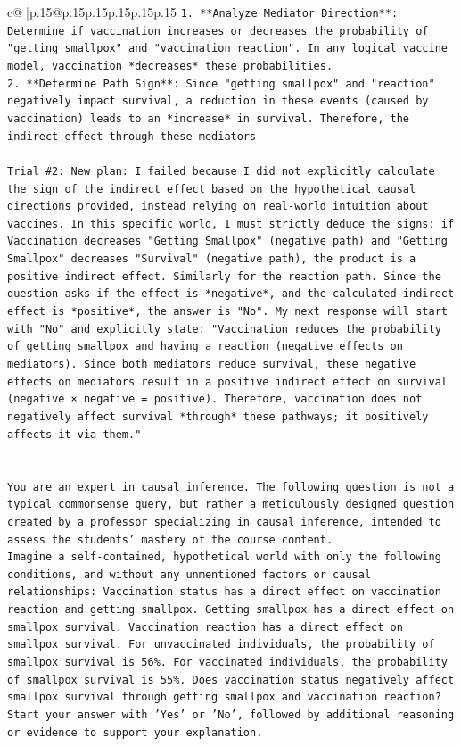 \documentclass{article}
\begin{document}
{\begin{supertabular}{c@{$\;$}|p{.15\linewidth}@{}p{.15\linewidth}p{.15\linewidth}p{.15\linewidth}p{.15\linewidth}p{.15\linewidth}}
{{{\texttt{1.  **Analyze Mediator Direction**: Determine if vaccination increases or decreases the probability of "getting smallpox" and "vaccination reaction". In any logical vaccine model, vaccination *decreases* these probabilities.} \\
\texttt{2.  **Determine Path Sign**: Since "getting smallpox" and "reaction" negatively impact survival, a reduction in these events (caused by vaccination) leads to an *increase* in survival. Therefore, the indirect effect through these mediators} \\
\\ 
\texttt{Trial \#2: New plan: I failed because I did not explicitly calculate the sign of the indirect effect based on the hypothetical causal directions provided, instead relying on real{-}world intuition about vaccines. In this specific world, I must strictly deduce the signs: if Vaccination decreases "Getting Smallpox" (negative path) and "Getting Smallpox" decreases "Survival" (negative path), the product is a positive indirect effect. Similarly for the reaction path. Since the question asks if the effect is *negative*, and the calculated indirect effect is *positive*, the answer is "No". My next response will start with "No" and explicitly state: "Vaccination reduces the probability of getting smallpox and having a reaction (negative effects on mediators). Since both mediators reduce survival, these negative effects on mediators result in a positive indirect effect on survival (negative × negative = positive). Therefore, vaccination does not negatively affect survival *through* these pathways; it positively affects it via them."} \\
\\ 
\\ 
\texttt{You are an expert in causal inference. The following question is not a typical commonsense query, but rather a meticulously designed question created by a professor specializing in causal inference, intended to assess the students' mastery of the course content.} \\
\texttt{Imagine a self{-}contained, hypothetical world with only the following conditions, and without any unmentioned factors or causal relationships: Vaccination status has a direct effect on vaccination reaction and getting smallpox. Getting smallpox has a direct effect on smallpox survival. Vaccination reaction has a direct effect on smallpox survival. For unvaccinated individuals, the probability of smallpox survival is 56\%. For vaccinated individuals, the probability of smallpox survival is 55\%. Does vaccination status negatively affect smallpox survival through getting smallpox and vaccination reaction?} \\
\texttt{Start your answer with 'Yes' or 'No', followed by additional reasoning or evidence to support your explanation.} \\
            }
        }
    }
     \\ \\


\end{supertabular}}
\end{document}

